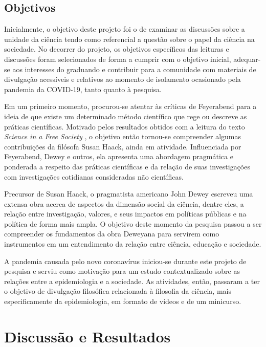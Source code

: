 \documentclass[12pt]{report}
\begin{document}
		\section*{Objetivos}
			Inicialmente, o objetivo deste projeto foi o de examinar as discussões sobre a unidade da ciência tendo como referencial a questão sobre o papel da ciência na sociedade.
			No decorrer do projeto, os objetivos específicos das leituras e discussões foram selecionados de forma a cumprir com o objetivo inicial, adequar-se aos interesses do graduando e contribuir para a comunidade com materiais de divulgação acessíveis e relativos ao momento de isolamento ocasionado pela pandemia da COVID-19, tanto quanto à pesquisa.
			
			Em um primeiro momento, procurou-se atentar às críticas de Feyerabend para a ideia de que existe um determinado método científico que rege ou descreve as práticas científicas.
			Motivado pelos resultados obtidos com a leitura do texto \textit{Science in a Free Society} \cite{feyerabend-science-free-society}, o objetivo então tornou-se compreender algumas contribuições da filósofa Susan Haack, ainda em atividade.
			Influenciada por Feyerabend, Dewey e outros, ela apresenta uma abordagem pragmática e ponderada a respeito das práticas científicas e da relação de suas investigações com investigações cotidianas consideradas não científicas.
			
			Precursor de Susan Haack, o pragmatista americano John Dewey escreveu uma extensa obra acerca de aspectos da dimensão social da ciência, dentre eles, a relação entre investigação, valores, e seus impactos em políticas públicas e na política de forma mais ampla.
			O objetivo deste momento da pesquisa passou a ser compreender os fundamentos da obra Deweyana para servirem como instrumentos em um entendimento da relação entre ciência, educação e sociedade.
			
			A pandemia causada pelo novo coronavírus iniciou-se durante este projeto de pesquisa e serviu como motivação para um estudo contextualizado sobre as relações entre a epidemiologia e a sociedade.
			As atividades, então, passaram a ter o objetivo de divulgação filosófica relacionada à filosofia da ciência, mais especificamente da epidemiologia, em formato de vídeos e de um minicurso.
	
	\vspace*{-0.6cm}
	\chapter*{Discussão e Resultados}
	\vspace*{-0.75cm}
	
\end{document}
